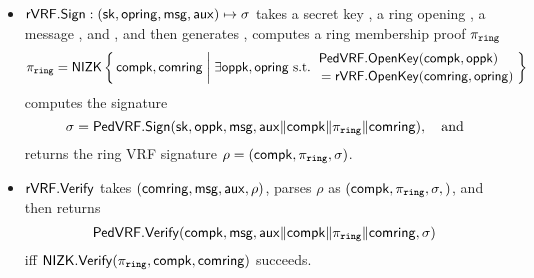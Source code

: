 
\begin{itemize}
\item ${\mathsf{rVRF}}.{\mathsf{Sign}} : (\mathsf{sk},\mathsf{opring},\mathsf{msg},\mathsf{aux}) \mapsto \sigma$ takes
 a secret key \sk, a ring opening \openring, a message \msg, and \aux, and then %
 generates \openpk, computes a ring membership proof $\pi_{\mathtt{ring}}$
  $$ \piring = \NIZK \Setst{ \compk, \comring }{
  \exists \openpk,\openring \textrm{\ s.t.\ } 
  \genfrac{}{}{0pt}{}{\PedVRF.\OpenKey(\compk,\openpk) \quad}{\,\, = \rVRF.\OpenKey(\comring,\openring)}
  } $$
 computes the signature
  $$ \sigma = {\mathsf{PedVRF}}.{\mathsf{Sign}}(\mathsf{sk},\mathsf{oppk},\mathsf{msg},\mathsf{aux} \| \mathsf{compk} \| \pi_{\mathtt{ring}} \| \mathsf{comring}), \quad\textrm{and} $$ %
 returns the ring VRF signature $\rho = (\mathsf{compk},\pi_{\mathtt{ring}},\sigma)$.
\item ${\mathsf{rVRF}}.{\mathsf{Verify}}$ takes $(\mathsf{comring},\mathsf{msg},\mathsf{aux},\rho)$,
 parses $\rho$ as $(\mathsf{compk},\pi_{\mathtt{ring}},\sigma,)$,  and then returns
 $$ {\mathsf{PedVRF}}.{\mathsf{Verify}}(\mathsf{compk},\mathsf{msg},\mathsf{aux} \| \mathsf{compk} \| \pi_{\mathtt{ring}} \| \mathsf{comring},\sigma) $$
 iff ${\mathsf{NIZK}}.{\mathsf{Verify}}(\pi_{\mathtt{ring}},\mathsf{compk},\mathsf{comring})$ succeeds. 
\end{itemize}


